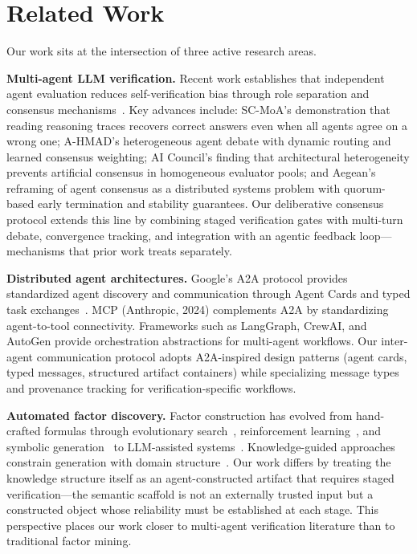 \documentclass[sigconf]{acmart}
\begin{document}
\section{Related Work}

Our work sits at the intersection of three active research areas.

\textbf{Multi-agent LLM verification.} Recent work establishes that independent agent evaluation reduces self-verification bias through role separation and consensus mechanisms~\cite{wang2025masllm,ghafarollahi2024sciagents,mao2025blueprint2code}. Key advances include: SC-MoA's demonstration that reading reasoning traces recovers correct answers even when all agents agree on a wrong one; A-HMAD's heterogeneous agent debate with dynamic routing and learned consensus weighting; AI Council's finding that architectural heterogeneity prevents artificial consensus in homogeneous evaluator pools; and Aegean's reframing of agent consensus as a distributed systems problem with quorum-based early termination and stability guarantees. Our deliberative consensus protocol extends this line by combining staged verification gates with multi-turn debate, convergence tracking, and integration with an agentic feedback loop---mechanisms that prior work treats separately.

\textbf{Distributed agent architectures.} Google's A2A protocol provides standardized agent discovery and communication through Agent Cards and typed task exchanges~\cite{wang2025masllm}. MCP (Anthropic, 2024) complements A2A by standardizing agent-to-tool connectivity. Frameworks such as LangGraph, CrewAI, and AutoGen provide orchestration abstractions for multi-agent workflows. Our inter-agent communication protocol adopts A2A-inspired design patterns (agent cards, typed messages, structured artifact containers) while specializing message types and provenance tracking for verification-specific workflows.

\textbf{Automated factor discovery.} Factor construction has evolved from hand-crafted formulas through evolutionary search~\cite{kakushadze2016101}, reinforcement learning~\cite{yu2023rlalpha}, and symbolic generation~\cite{zhang2020autoalpha} to LLM-assisted systems~\cite{wang2024alphagpt,tang2025alphaagent,shi2025alphaforge}. Knowledge-guided approaches constrain generation with domain structure~\cite{guo2022quant40,lin2026factorengine,guo2026alphaprobe}. Our work differs by treating the knowledge structure itself as an agent-constructed artifact that requires staged verification---the semantic scaffold is not an externally trusted input but a constructed object whose reliability must be established at each stage. This perspective places our work closer to multi-agent verification literature than to traditional factor mining.
\end{document}
